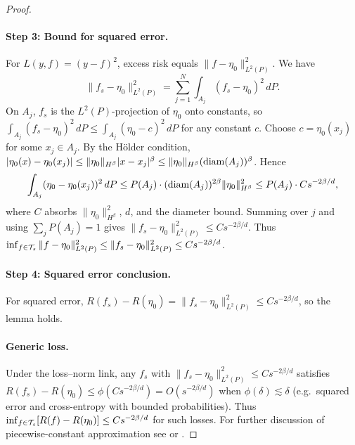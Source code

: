 \documentclass[12pt]{article}
\begin{document}
\begin{proof}
\paragraph{Step 3: Bound for squared error.}
For $L(y,f) = (y-f)^2$, excess risk equals $\|f - \eta_0\|_{L^2(P)}^2$. We have
\[
\|f_s - \eta_0\|_{L^2(P)}^2 = \sum_{j=1}^N \int_{A_j} (f_s - \eta_0)^2 \, dP.
\]
On $A_j$, $f_s$ is the $L^2(P)$-projection of $\eta_0$ onto constants, so $\int_{A_j} (f_s - \eta_0)^2 \, dP \le \int_{A_j} (\eta_0 - c)^2 \, dP$ for any constant $c$. Choose $c = \eta_0(x_j)$ for some $x_j \in A_j$. By the H\"older condition, $|\eta_0(x) - \eta_0(x_j)| \le \|\eta_0\|_{H^\beta} |x - x_j|^\beta \le \|\eta_0\|_{H^\beta} (\mathrm{diam}(A_j))^\beta$. Hence
\[
\int_{A_j} (\eta_0 - \eta_0(x_j))^2 \, dP \le P(A_j) \cdot (\mathrm{diam}(A_j))^{2\beta} \|\eta_0\|_{H^\beta}^2 \le P(A_j) \cdot C s^{-2\beta/d},
\]
where $C$ absorbs $\|\eta_0\|_{H^\beta}^2$, $d$, and the diameter bound. Summing over $j$ and using $\sum_j P(A_j) = 1$ gives $\|f_s - \eta_0\|_{L^2(P)}^2 \le C s^{-2\beta/d}$. Thus $\inf_{f \in \mathcal{T}_s} \|f - \eta_0\|_{L^2(P)}^2 \le \|f_s - \eta_0\|_{L^2(P)}^2 \le C s^{-2\beta/d}$.

\paragraph{Step 4: Squared error conclusion.}
For squared error, $R(f_s) - R(\eta_0) = \|f_s - \eta_0\|_{L^2(P)}^2 \le C s^{-2\beta/d}$, so the lemma holds.

\paragraph{Generic loss.}
Under the loss--norm link, any $f_s$ with $\|f_s - \eta_0\|_{L^2(P)}^2 \le C s^{-2\beta/d}$ satisfies $R(f_s) - R(\eta_0) \le \phi(C s^{-2\beta/d}) = O(s^{-2\beta/d})$ when $\phi(\delta) \lesssim \delta$ (e.g.\ squared error and cross-entropy with bounded probabilities). Thus $\inf_{f \in \mathcal{T}_s} [R(f) - R(\eta_0)] \le C s^{-2\beta/d}$ for such losses. For further discussion of piecewise-constant approximation see \citet{gyorfiLeastSquaresEstimates2002} or \citet{devoreConstructiveApproximation1993}.


\end{proof}
\end{document}
